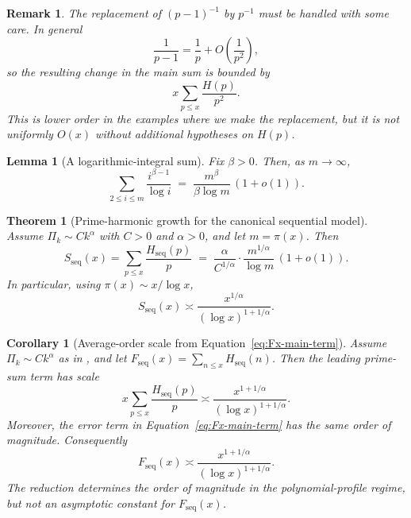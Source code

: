 \documentclass[10pt,a4paper]{amsart}
\newtheorem{remark}{Remark}
\newtheorem{lemma}{Lemma}
\newtheorem{theorem}{Theorem}
\newtheorem{corollary}{Corollary}
\newcommand{\height}{H}
\begin{document}
\begin{remark}\label{rem:pminus1}
The replacement of $(p-1)^{-1}$ by $p^{-1}$ must be handled with some care.
In general
\[
  \frac1{p-1}=\frac1p+O\!\left(\frac1{p^2}\right),
\]
so the resulting change in the main sum is bounded by
\[
  x\sum_{p\le x}\frac{H(p)}{p^2}.
\]
This is lower order in the examples where we make the replacement, but it is not
uniformly $O(x)$ without additional hypotheses on $H(p)$.
\end{remark}

\begin{lemma}[A logarithmic-integral sum]\label{lem:logint-sum}
Fix $\beta>0$. Then, as $m\to\infty$,
\[
\sum_{2\le i\le m}\frac{i^{\beta-1}}{\log i}
\;=\;
\frac{m^\beta}{\beta\log m}\,(1+o(1)).
\]
\end{lemma}

\begin{theorem}[Prime-harmonic growth for the canonical sequential model]\label{thm:seq-prime-sum}
Assume $\Pi_k\sim Ck^\alpha$ with $C>0$ and $\alpha>0$, and let $m=\pi(x)$.
Then
\[
S_{\mathrm{seq}}(x)=\sum_{p\le x}\frac{\height_{\mathrm{seq}}(p)}{p}
\;=\;
\frac{\alpha}{C^{1/\alpha}}\cdot \frac{m^{1/\alpha}}{\log m}\,(1+o(1)).
\]
In particular, using $\pi(x)\sim x/\log x$,
\[
S_{\mathrm{seq}}(x)\asymp \frac{x^{1/\alpha}}{(\log x)^{1+1/\alpha}}.
\]
\end{theorem}

\begin{corollary}[Average-order scale from Equation~\eqref{eq:Fx-main-term}]
\label{cor:seq-avgorder-scale}
Assume $\Pi_k\sim Ck^\alpha$ as in , and let
$F_{\mathrm{seq}}(x)=\sum_{n\le x}\height_{\mathrm{seq}}(n)$.  Then the leading
prime-sum term has scale
\[
  x\sum_{p\le x}\frac{\height_{\mathrm{seq}}(p)}{p}
  \asymp
  \frac{x^{1+1/\alpha}}{(\log x)^{1+1/\alpha}}.
\]
Moreover, the error term in Equation~\eqref{eq:Fx-main-term} has the same order of
magnitude.  Consequently
\[
  F_{\mathrm{seq}}(x)
  \asymp
  \frac{x^{1+1/\alpha}}{(\log x)^{1+1/\alpha}}.
\]
The reduction determines the order of magnitude in the polynomial-profile
regime, but not an asymptotic constant for $F_{\mathrm{seq}}(x)$.
\end{corollary}
\end{document}
